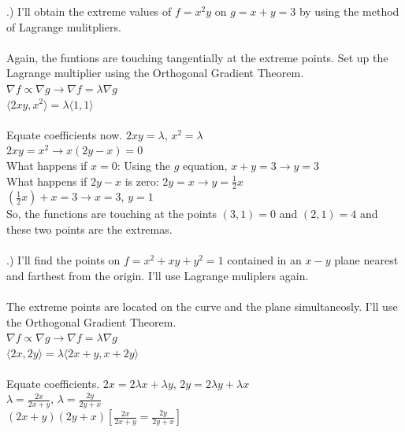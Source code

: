 \documentclass[12pt]{article}
\begin{document}
.) I'll obtain the extreme values of $f = x^{2}y$ on $g = x+y=3$ by using the method of Lagrange mulitpliers.\\\\
\noindent Again, the funtions are touching tangentially at the extreme points. Set up the Lagrange multiplier using the Orthogonal Gradient Theorem. 
\noindent $\nabla f \propto \nabla g \rightarrow \nabla f = \lambda \nabla g$\\
\noindent $ \langle 2xy,x^{2}\rangle = \lambda \langle 1, 1\rangle$\\\\
\noindent Equate coefficients now. $2xy = \lambda$, \hspace{10pt} $x^{2} = \lambda$\\
\noindent $2xy = x^{2} \rightarrow x(2y -x) = 0$\\
\noindent What happens if $x = 0$:
\noindent Using the $g$ equation, $x + y = 3 \rightarrow y = 3$\\
\noindent What happens if $2y -x$ is zero:
\noindent $2y = x \rightarrow y = \frac{1}{2}x$\\
\noindent $(\frac{1}{2}x) + x = 3 \rightarrow x = 3$, $y = 1$\\
\noindent So, the functions are touching at the points $(3, 1) = 0$ and $(2, 1) = 4$ and these two points are the extremas. \\\\
.) I'll find the points on $f = x^{2}+xy+y^{2} = 1$ contained in an $x-y$ plane nearest and farthest from the origin. I'll use Lagrange muliplers again.\\\\
\noindent The extreme points are located on the curve and the plane simultaneosly. I'll use the Orthogonal Gradient Theorem.\\
\noindent $\nabla f \propto \nabla g \rightarrow \nabla f = \lambda \nabla g$\\
\noindent $ \langle 2x,2y\rangle = \lambda \langle 2x+y, x+2y\rangle$\\\\
\noindent Equate coefficients. $2x = 2\lambda x +\lambda y$, \hspace{10pt} $2y = 2\lambda y + \lambda x$\\
\noindent $\lambda = \frac{2x}{2x+y}$, \hspace{10pt} $\lambda = \frac{2y}{2y+x}$\\
\noindent $(2x+y)(2y+x)[\frac{2x}{2x+y} = \frac{2y}{2y+x}]$\\
\end{document}
